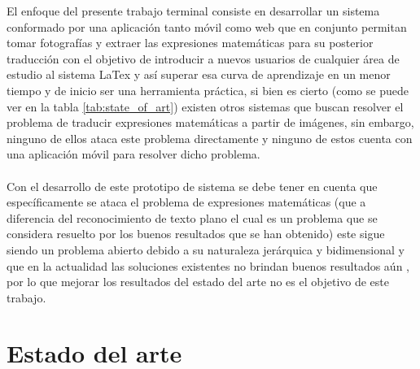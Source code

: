 El enfoque del presente trabajo terminal consiste en desarrollar un sistema conformado por una aplicación tanto móvil como web que en conjunto permitan tomar fotografías y extraer las expresiones matemáticas para su posterior traducción con el objetivo de introducir a nuevos usuarios de cualquier área de estudio al sistema LaTex y así superar esa curva de aprendizaje en un menor tiempo y de inicio ser una herramienta práctica, si bien es cierto (como se puede ver en la tabla																							 \ref{tab:state_of_art}) existen otros sistemas que buscan resolver el problema de traducir expresiones matemáticas a partir de imágenes, sin embargo, ninguno de ellos ataca este problema directamente y ninguno de estos cuenta con una aplicación móvil para resolver dicho problema.
\\\\%

Con el desarrollo de este prototipo de sistema se debe tener en cuenta que específicamente se ataca el problema de expresiones matemáticas (que a diferencia del reconocimiento de texto plano el cual es un problema que se considera resuelto por los buenos resultados que se han obtenido) este sigue siendo un problema abierto debido a su naturaleza jerárquica y bidimensional y que en la actualidad las soluciones existentes no brindan buenos resultados aún \cite{chino}, por lo que mejorar los resultados del estado del arte no es el objetivo de este trabajo.


\newpage

\section{Estado del arte}

